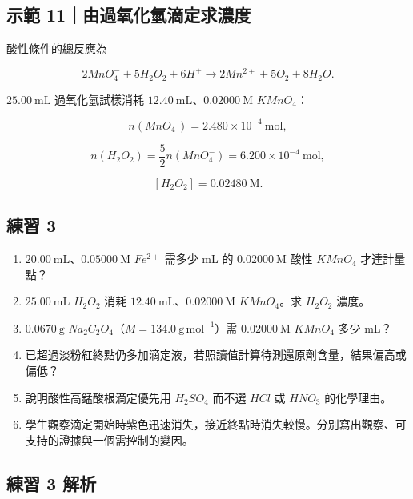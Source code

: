 \documentclass[11pt,a4paper]{article}
\providecommand{\tightlist}{%
  \setlength{\itemsep}{0pt}\setlength{\parskip}{0pt}}
\begin{document}
\begin{HandoutWorkedExample}

\subsection{示範 11｜由過氧化氫滴定求濃度}\label{ux793aux7bc4-11ux7531ux904eux6c27ux5316ux6c2bux6ef4ux5b9aux6c42ux6fc3ux5ea6}

酸性條件的總反應為

\[
2MnO_4^-+5H_2O_2+6H^+\rightarrow2Mn^{2+}+5O_2+8H_2O.
\]

\(25.00\ \mathrm{mL}\) 過氧化氫試樣消耗 \(12.40\ \mathrm{mL}\)、\(0.02000\ \mathrm M\) \(KMnO_4\)：

\[
n(MnO_4^-)=2.480\times10^{-4}\ \mathrm{mol},
\]

\[
n(H_2O_2)=\frac52n(MnO_4^-)=6.200\times10^{-4}\ \mathrm{mol},
\]

\[
[H_2O_2]=0.02480\ \mathrm M.
\]

\end{HandoutWorkedExample}

\subsection{練習 3}\label{ux7df4ux7fd2-3}

\begin{enumerate}
\def\labelenumi{\arabic{enumi}.}
\tightlist
\item
  \(20.00\ \mathrm{mL}\)、\(0.05000\ \mathrm M\) \(Fe^{2+}\) 需多少 mL 的 \(0.02000\ \mathrm M\) 酸性 \(KMnO_4\) 才達計量點？
\item
  \(25.00\ \mathrm{mL}\) \(H_2O_2\) 消耗 \(12.40\ \mathrm{mL}\)、\(0.02000\ \mathrm M\) \(KMnO_4\)。求 \(H_2O_2\) 濃度。
\item
  \(0.0670\ \mathrm g\) \(Na_2C_2O_4\)（\(M=134.0\ \mathrm{g\,mol^{-1}}\)）需 \(0.02000\ \mathrm M\) \(KMnO_4\) 多少 mL？
\item
  已超過淡粉紅終點仍多加滴定液，若照讀值計算待測還原劑含量，結果偏高或偏低？
\item
  說明酸性高錳酸根滴定優先用 \(H_2SO_4\) 而不選 \(HCl\) 或 \(HNO_3\) 的化學理由。
\item
  學生觀察滴定開始時紫色迅速消失，接近終點時消失較慢。分別寫出觀察、可支持的證據與一個需控制的變因。
\end{enumerate}

\subsection{練習 3 解析}\label{ux7df4ux7fd2-3-ux89e3ux6790}
\end{document}
